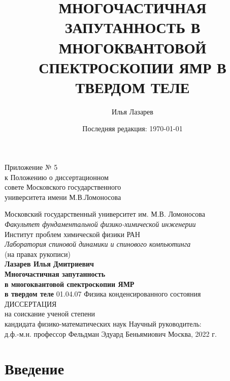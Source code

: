 \documentclass[14pt]{extreport}
\title{МНОГОЧАСТИЧНАЯ ЗАПУТАННОСТЬ В МНОГОКВАНТОВОЙ СПЕКТРОСКОПИИ ЯМР В ТВЕРДОМ ТЕЛЕ}
\author{Илья Лазарев}
\date{Последняя редакция: \today}
\begin{document}
\maketitle
\begin{titlepage}
\begin{flushright}
   Приложение № 5 \\
   к Положению о диссертационном \\
   совете Московского государственного \\
   университета имени М.В.Ломоносова
\end{flushright}
\vspace{1cm}
\begin{center}
  {\large Московский государственный университет им. М.В. Ломоносова} \\
  {\it Факультет фундаментальной физико-химической инженерии} \\
  \vspace{1cm} 
  {\large Институт проблем химической физики РАН} \\
  {\it Лаборатория спиновой динамики и спинового компьютинга} \\
  \vfill
  (на правах рукописи) \\ 
  \vfill
  {\Large \bf Лазарев Илья Дмитриевич} \\
  \vspace{1cm}
  {\Large \bf 
      Многочастичная запутанность \\
      в многоквантовой спектроскопии ЯМР \\
      \vspace{2mm}
      в твердом теле
  }
 \vfill
 01.04.07 Физика конденсированного состояния \\
 \vspace{1cm}
 ДИССЕРТАЦИЯ \\
 на соискание ученой степени \\
 кандидата физико-математических наук
 \vfill
 {\large
   Научный руководитель:\\
   д.ф.-м.н. профессор Фельдман Эдуард Беньямиович
 }
 \vfill
 Москва, 2022 г.
\end{center}
\end{titlepage}

\addtocounter{page}{1}


\tableofcontents


\chapter*{Введение}
  
\end{document}
